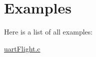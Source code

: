 \section{Examples}
Here is a list of all examples\-:\begin{DoxyCompactItemize}
\item 
\hyperlink{uart_flight_8c-example}{uart\-Flight.\-c}
\end{DoxyCompactItemize}
